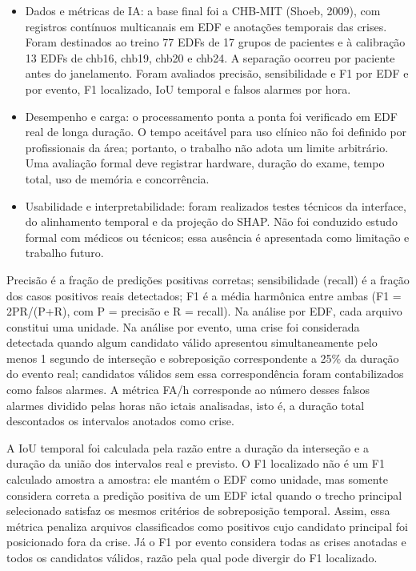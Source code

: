 \begin{itemize}[leftmargin=1.25cm,itemsep=0pt,topsep=0pt]
\item Dados e métricas de IA: a base final foi a CHB-MIT (Shoeb, 2009), com registros contínuos multicanais em EDF e anotações temporais das crises. Foram destinados ao treino 77 EDFs de 17 grupos de pacientes e à calibração 13 EDFs de chb16, chb19, chb20 e chb24. A separação ocorreu por paciente antes do janelamento. Foram avaliados precisão, sensibilidade e F1 por EDF e por evento, F1 localizado, IoU temporal e falsos alarmes por hora.
\item Desempenho e carga: o processamento ponta a ponta foi verificado em EDF real de longa duração. O tempo aceitável para uso clínico não foi definido por profissionais da área; portanto, o trabalho não adota um limite arbitrário. Uma avaliação formal deve registrar hardware, duração do exame, tempo total, uso de memória e concorrência.
\item Usabilidade e interpretabilidade: foram realizados testes técnicos da interface, do alinhamento temporal e da projeção do SHAP. Não foi conduzido estudo formal com médicos ou técnicos; essa ausência é apresentada como limitação e trabalho futuro.
\end{itemize}
Precisão é a fração de predições positivas corretas; sensibilidade (recall) é a fração dos casos positivos reais detectados; F1 é a média harmônica entre ambas (F1 = 2PR/(P+R), com P = precisão e R = recall). Na análise por EDF, cada arquivo constitui uma unidade. Na análise por evento, uma crise foi considerada detectada quando algum candidato válido apresentou simultaneamente pelo menos 1 segundo de interseção e sobreposição correspondente a 25\% da duração do evento real; candidatos válidos sem essa correspondência foram contabilizados como falsos alarmes. A métrica FA/h corresponde ao número desses falsos alarmes dividido pelas horas não ictais analisadas, isto é, a duração total descontados os intervalos anotados como crise.

A IoU temporal foi calculada pela razão entre a duração da interseção e a duração da união dos intervalos real e previsto. O F1 localizado não é um F1 calculado amostra a amostra: ele mantém o EDF como unidade, mas somente considera correta a predição positiva de um EDF ictal quando o trecho principal selecionado satisfaz os mesmos critérios de sobreposição temporal. Assim, essa métrica penaliza arquivos classificados como positivos cujo candidato principal foi posicionado fora da crise. Já o F1 por evento considera todas as crises anotadas e todos os candidatos válidos, razão pela qual pode divergir do F1 localizado.

